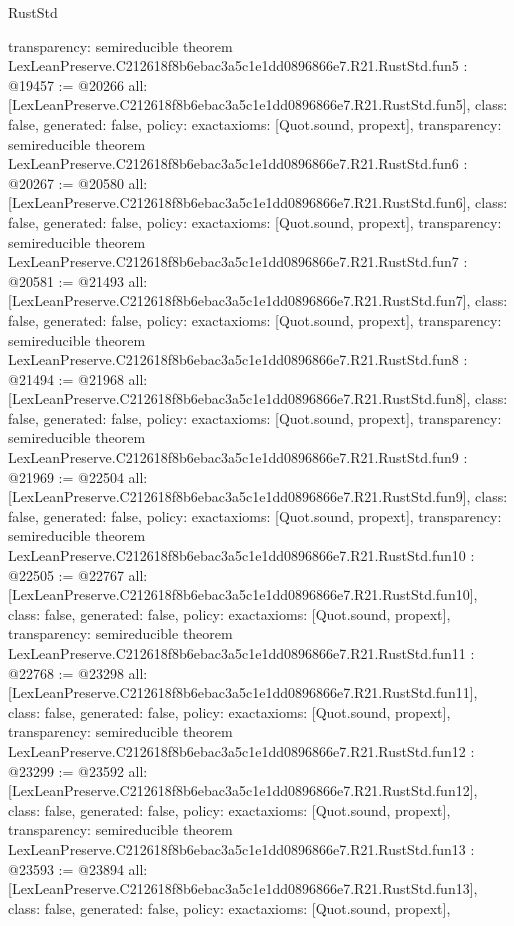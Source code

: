 \begin{lexlean}{RustStd}
\begin{coremodule}
{  transparency: semireducible
}
theorem LexLeanPreserve.C212618f8b6ebac3a5c1e1dd0896866e7.R21.RustStd.fun5 : @19457 := @20266 {
  all: [LexLeanPreserve.C212618f8b6ebac3a5c1e1dd0896866e7.R21.RustStd.fun5],
  class: false,
  generated: false,
  policy: exact{axioms: [Quot.sound, propext]},
  transparency: semireducible
}
theorem LexLeanPreserve.C212618f8b6ebac3a5c1e1dd0896866e7.R21.RustStd.fun6 : @20267 := @20580 {
  all: [LexLeanPreserve.C212618f8b6ebac3a5c1e1dd0896866e7.R21.RustStd.fun6],
  class: false,
  generated: false,
  policy: exact{axioms: [Quot.sound, propext]},
  transparency: semireducible
}
theorem LexLeanPreserve.C212618f8b6ebac3a5c1e1dd0896866e7.R21.RustStd.fun7 : @20581 := @21493 {
  all: [LexLeanPreserve.C212618f8b6ebac3a5c1e1dd0896866e7.R21.RustStd.fun7],
  class: false,
  generated: false,
  policy: exact{axioms: [Quot.sound, propext]},
  transparency: semireducible
}
theorem LexLeanPreserve.C212618f8b6ebac3a5c1e1dd0896866e7.R21.RustStd.fun8 : @21494 := @21968 {
  all: [LexLeanPreserve.C212618f8b6ebac3a5c1e1dd0896866e7.R21.RustStd.fun8],
  class: false,
  generated: false,
  policy: exact{axioms: [Quot.sound, propext]},
  transparency: semireducible
}
theorem LexLeanPreserve.C212618f8b6ebac3a5c1e1dd0896866e7.R21.RustStd.fun9 : @21969 := @22504 {
  all: [LexLeanPreserve.C212618f8b6ebac3a5c1e1dd0896866e7.R21.RustStd.fun9],
  class: false,
  generated: false,
  policy: exact{axioms: [Quot.sound, propext]},
  transparency: semireducible
}
theorem LexLeanPreserve.C212618f8b6ebac3a5c1e1dd0896866e7.R21.RustStd.fun10 : @22505 := @22767 {
  all: [LexLeanPreserve.C212618f8b6ebac3a5c1e1dd0896866e7.R21.RustStd.fun10],
  class: false,
  generated: false,
  policy: exact{axioms: [Quot.sound, propext]},
  transparency: semireducible
}
theorem LexLeanPreserve.C212618f8b6ebac3a5c1e1dd0896866e7.R21.RustStd.fun11 : @22768 := @23298 {
  all: [LexLeanPreserve.C212618f8b6ebac3a5c1e1dd0896866e7.R21.RustStd.fun11],
  class: false,
  generated: false,
  policy: exact{axioms: [Quot.sound, propext]},
  transparency: semireducible
}
theorem LexLeanPreserve.C212618f8b6ebac3a5c1e1dd0896866e7.R21.RustStd.fun12 : @23299 := @23592 {
  all: [LexLeanPreserve.C212618f8b6ebac3a5c1e1dd0896866e7.R21.RustStd.fun12],
  class: false,
  generated: false,
  policy: exact{axioms: [Quot.sound, propext]},
  transparency: semireducible
}
theorem LexLeanPreserve.C212618f8b6ebac3a5c1e1dd0896866e7.R21.RustStd.fun13 : @23593 := @23894 {
  all: [LexLeanPreserve.C212618f8b6ebac3a5c1e1dd0896866e7.R21.RustStd.fun13],
  class: false,
  generated: false,
  policy: exact{axioms: [Quot.sound, propext]},
}
\end{coremodule}
\end{lexlean}

